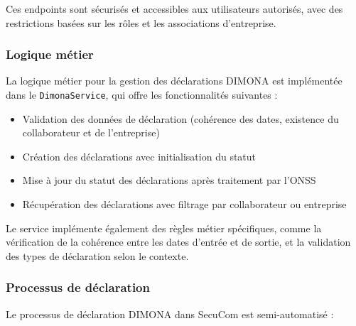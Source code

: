 \vspace{0.5cm}

Ces endpoints sont sécurisés et accessibles aux utilisateurs autorisés, avec des restrictions basées sur les rôles et les associations d'entreprise.

\subsubsection{Logique métier}

La logique métier pour la gestion des déclarations DIMONA est implémentée dans le \texttt{DimonaService}, qui offre les fonctionnalités suivantes :

\vspace{0.5cm}

\begin{itemize}[leftmargin=*,label=\textcolor{darkgray}{$\bullet$},itemsep=0.3em]
  \item Validation des données de déclaration (cohérence des dates, existence du collaborateur et de l'entreprise)
  \item Création des déclarations avec initialisation du statut
  \item Mise à jour du statut des déclarations après traitement par l'ONSS
  \item Récupération des déclarations avec filtrage par collaborateur ou entreprise
\end{itemize}

\vspace{0.5cm}

Le service implémente également des règles métier spécifiques, comme la vérification de la cohérence entre les dates d'entrée et de sortie, et la validation des types de déclaration selon le contexte.

\subsubsection{Processus de déclaration}

Le processus de déclaration DIMONA dans SecuCom est semi-automatisé :

\vspace{0.5cm}

